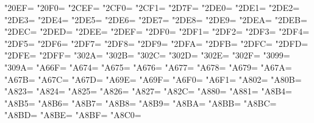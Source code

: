 \XeTeXcharclass"20EF=\KclassCM
\XeTeXcharclass"20F0=\KclassCM
\XeTeXcharclass"2CEF=\KclassCM
\XeTeXcharclass"2CF0=\KclassCM
\XeTeXcharclass"2CF1=\KclassCM
\XeTeXcharclass"2D7F=\KclassCM
\XeTeXcharclass"2DE0=\KclassCM
\XeTeXcharclass"2DE1=\KclassCM
\XeTeXcharclass"2DE2=\KclassCM
\XeTeXcharclass"2DE3=\KclassCM
\XeTeXcharclass"2DE4=\KclassCM
\XeTeXcharclass"2DE5=\KclassCM
\XeTeXcharclass"2DE6=\KclassCM
\XeTeXcharclass"2DE7=\KclassCM
\XeTeXcharclass"2DE8=\KclassCM
\XeTeXcharclass"2DE9=\KclassCM
\XeTeXcharclass"2DEA=\KclassCM
\XeTeXcharclass"2DEB=\KclassCM
\XeTeXcharclass"2DEC=\KclassCM
\XeTeXcharclass"2DED=\KclassCM
\XeTeXcharclass"2DEE=\KclassCM
\XeTeXcharclass"2DEF=\KclassCM
\XeTeXcharclass"2DF0=\KclassCM
\XeTeXcharclass"2DF1=\KclassCM
\XeTeXcharclass"2DF2=\KclassCM
\XeTeXcharclass"2DF3=\KclassCM
\XeTeXcharclass"2DF4=\KclassCM
\XeTeXcharclass"2DF5=\KclassCM
\XeTeXcharclass"2DF6=\KclassCM
\XeTeXcharclass"2DF7=\KclassCM
\XeTeXcharclass"2DF8=\KclassCM
\XeTeXcharclass"2DF9=\KclassCM
\XeTeXcharclass"2DFA=\KclassCM
\XeTeXcharclass"2DFB=\KclassCM
\XeTeXcharclass"2DFC=\KclassCM
\XeTeXcharclass"2DFD=\KclassCM
\XeTeXcharclass"2DFE=\KclassCM
\XeTeXcharclass"2DFF=\KclassCM
\XeTeXcharclass"302A=\KclassCM
\XeTeXcharclass"302B=\KclassCM
\XeTeXcharclass"302C=\KclassCM
\XeTeXcharclass"302D=\KclassCM
\XeTeXcharclass"302E=\KclassCM
\XeTeXcharclass"302F=\KclassCM
\XeTeXcharclass"3099=\KclassCM
\XeTeXcharclass"309A=\KclassCM
\XeTeXcharclass"A66F=\KclassCM
\XeTeXcharclass"A674=\KclassCM
\XeTeXcharclass"A675=\KclassCM
\XeTeXcharclass"A676=\KclassCM
\XeTeXcharclass"A677=\KclassCM
\XeTeXcharclass"A678=\KclassCM
\XeTeXcharclass"A679=\KclassCM
\XeTeXcharclass"A67A=\KclassCM
\XeTeXcharclass"A67B=\KclassCM
\XeTeXcharclass"A67C=\KclassCM
\XeTeXcharclass"A67D=\KclassCM
\XeTeXcharclass"A69E=\KclassCM
\XeTeXcharclass"A69F=\KclassCM
\XeTeXcharclass"A6F0=\KclassCM
\XeTeXcharclass"A6F1=\KclassCM
\XeTeXcharclass"A802=\KclassCM
\XeTeXcharclass"A80B=\KclassCM
\XeTeXcharclass"A823=\KclassCM
\XeTeXcharclass"A824=\KclassCM
\XeTeXcharclass"A825=\KclassCM
\XeTeXcharclass"A826=\KclassCM
\XeTeXcharclass"A827=\KclassCM
\XeTeXcharclass"A82C=\KclassCM
\XeTeXcharclass"A880=\KclassCM
\XeTeXcharclass"A881=\KclassCM
\XeTeXcharclass"A8B4=\KclassCM
\XeTeXcharclass"A8B5=\KclassCM
\XeTeXcharclass"A8B6=\KclassCM
\XeTeXcharclass"A8B7=\KclassCM
\XeTeXcharclass"A8B8=\KclassCM
\XeTeXcharclass"A8B9=\KclassCM
\XeTeXcharclass"A8BA=\KclassCM
\XeTeXcharclass"A8BB=\KclassCM
\XeTeXcharclass"A8BC=\KclassCM
\XeTeXcharclass"A8BD=\KclassCM
\XeTeXcharclass"A8BE=\KclassCM
\XeTeXcharclass"A8BF=\KclassCM
\XeTeXcharclass"A8C0=\KclassCM
